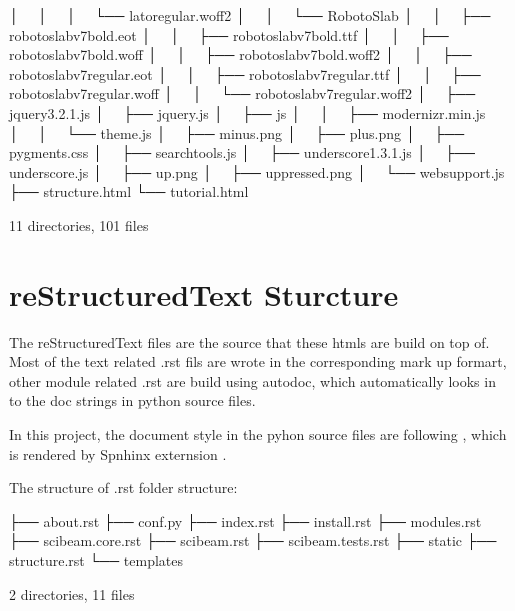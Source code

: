 \documentclass[letterpaper,10pt,english]{sphinxmanual}
\begin{document}
\begin{sphinxVerbatim}[commandchars=\\\{\}]
│   │   │   └── lato\PYGZhy{}regular.woff2
│   │   └── RobotoSlab
│   │       ├── roboto\PYGZhy{}slab\PYGZhy{}v7\PYGZhy{}bold.eot
│   │       ├── roboto\PYGZhy{}slab\PYGZhy{}v7\PYGZhy{}bold.ttf
│   │       ├── roboto\PYGZhy{}slab\PYGZhy{}v7\PYGZhy{}bold.woff
│   │       ├── roboto\PYGZhy{}slab\PYGZhy{}v7\PYGZhy{}bold.woff2
│   │       ├── roboto\PYGZhy{}slab\PYGZhy{}v7\PYGZhy{}regular.eot
│   │       ├── roboto\PYGZhy{}slab\PYGZhy{}v7\PYGZhy{}regular.ttf
│   │       ├── roboto\PYGZhy{}slab\PYGZhy{}v7\PYGZhy{}regular.woff
│   │       └── roboto\PYGZhy{}slab\PYGZhy{}v7\PYGZhy{}regular.woff2
│   ├── jquery\PYGZhy{}3.2.1.js
│   ├── jquery.js
│   ├── js
│   │   ├── modernizr.min.js
│   │   └── theme.js
│   ├── minus.png
│   ├── plus.png
│   ├── pygments.css
│   ├── searchtools.js
│   ├── underscore\PYGZhy{}1.3.1.js
│   ├── underscore.js
│   ├── up.png
│   ├── up\PYGZhy{}pressed.png
│   └── websupport.js
├── structure.html
└── tutorial.html

11 directories, 101 files
\end{sphinxVerbatim}


\section{reStructuredText Sturcture}
\label{\detokenize{about:restructuredtext-sturcture}}
The reStructuredText files are the source that these htmls are build on top of. Most of the text related .rst fils are wrote in the corresponding mark up formart, other module related .rst are build using autodoc, which automatically looks in to the doc strings in python source files.

In this project, the document style in the pyhon source files are following , which is rendered by Spnhinx externsion .

The structure of .rst folder structure:

%
\begin{sphinxVerbatim}[commandchars=\\\{\}]
├── about.rst
├── conf.py
├── index.rst
├── install.rst
├── modules.rst
├── scibeam.core.rst
├── scibeam.rst
├── scibeam.tests.rst
├── \PYGZus{}static
├── structure.rst
└── \PYGZus{}templates

2 directories, 11 files
\end{sphinxVerbatim}
\end{document}
